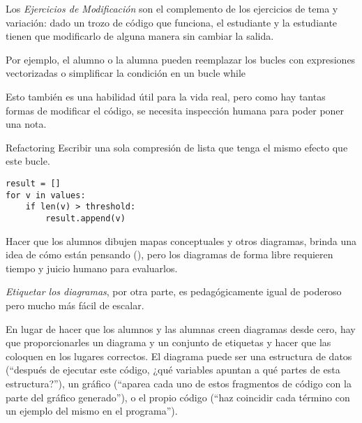 Los \emph{Ejercicios de Modificación} son el complemento de los ejercicios de  tema y variación: 
dado un trozo de código que funciona, el estudiante y la estudiante tienen que modificarlo de alguna manera sin cambiar la salida.

Por ejemplo, 
el alumno o la alumna pueden reemplazar los bucles con expresiones vectorizadas
 o simplificar la condición en un bucle while

Esto también es una habilidad útil para la vida real, 
pero como hay tantas formas de modificar el código,
se necesita inspección humana para poder poner una nota.

\begin{aside}{Refactoring}
  Escribir una sola compresión de lista que tenga el mismo efecto que este bucle.

\begin{verbatim}
result = []
for v in values:
    if len(v) > threshold:
        result.append(v)
\end{verbatim}
\end{aside}



Hacer que los alumnos dibujen mapas conceptuales y otros diagramas, brinda una idea de cómo están pensando (),
pero los diagramas de forma libre requieren tiempo y juicio humano para evaluarlos.

\emph{Etiquetar los diagramas},
por otra parte, 
es pedagógicamente igual de poderoso 
pero mucho más fácil de escalar.

En lugar de hacer que los alumnos y las alumnas creen diagramas desde cero, hay que proporcionarles un diagrama y un conjunto de etiquetas y hacer que las coloquen en  los lugares correctos.
El diagrama puede ser una estructura de datos (``después de ejecutar este código, ¿qué variables apuntan a qué partes de esta estructura?''), un gráfico (``aparea cada uno de estos fragmentos de código con la parte del gráfico generado''), o el propio código (``haz coincidir cada término con un ejemplo del mismo en el programa'').

